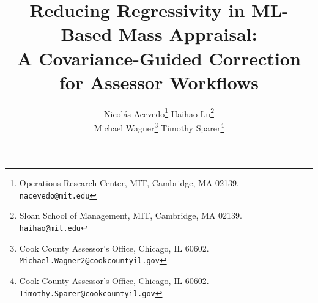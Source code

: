 \documentclass[10pt]{article}
\title{Reducing Regressivity in ML-Based Mass Appraisal:\\
A Covariance-Guided Correction for Assessor Workflows}
\author{
Nicol\'as Acevedo\thanks{Operations Research Center, MIT, Cambridge, MA 02139. \texttt{nacevedo@mit.edu}}
\qquad
Haihao Lu\thanks{Sloan School of Management, MIT, Cambridge, MA 02139. \texttt{haihao@mit.edu}}
\\[1ex]
Michael Wagner\thanks{Cook County Assessor's Office, Chicago, IL 60602. \texttt{Michael.Wagner2@cookcountyil.gov}}
\qquad
Timothy Sparer\thanks{Cook County Assessor's Office, Chicago, IL 60602. \texttt{Timothy.Sparer@cookcountyil.gov}}
}
\date{}
\theoremstyle{definition}
\newcommand{\1}{\mathbf{1}}
\begin{document}
\maketitle


\begin{abstract}


\end{abstract}
\end{document}
